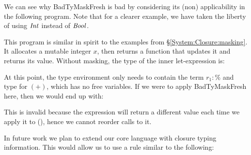 
We can see why BadTyMaskFresh is bad by considering its (non) applicability in the following program. Note that for a clearer example, we have taken the liberty of using $\operatorname{\mathit{Int}}$ instead of $\operatorname{\mathit{Bool}}$.


This program is similar in spirit to the examples from \S\ref{System:Closure:masking}. It allocates a mutable integer $x$, then returns a function that updates it and returns its value. Without masking, the type of the inner let-expression is:


At this point, the type environment only needs to contain the term $r_1 : \%$ and type for $(+)$, which has no free variables. If we were to apply BadTyMaskFresh here, then we would end up with:


This is invalid because the expression will return a different value each time we apply it to (), hence we cannot reorder calls to it.

In future work we plan to extend our core language with closure typing information. This would allow us to use a rule similar to the following:


